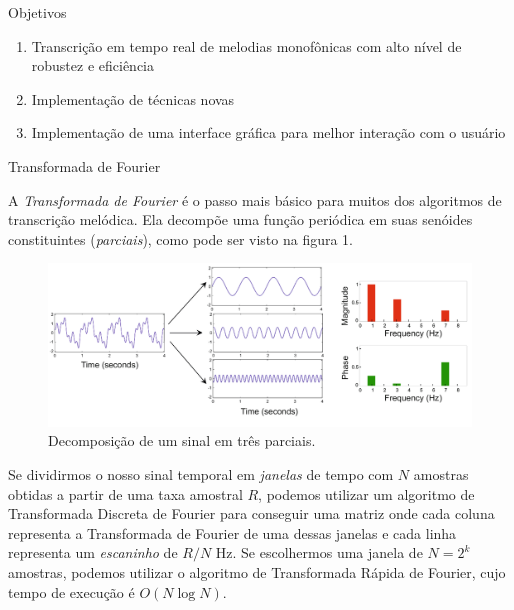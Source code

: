 \documentclass[final,hyperref={pdfpagelabels=false}]{beamer}
\begin{document}
\begin{frame}[t]
\begin{columns}[t]
\begin{column}{.465\textwidth}

\begin{block}{Objetivos}

\begin{enumerate}
\item Transcrição em tempo real de melodias monofônicas com alto nível de robustez e eficiência
\item Implementação de técnicas novas
\item Implementação de uma interface gráfica para melhor interação com o usuário
\end{enumerate}

\end{block}


\begin{block}{Transformada de Fourier}

A \emph{Transformada de Fourier} é o passo mais básico para muitos dos algoritmos de transcrição melódica. Ela decompõe uma função periódica em suas senóides constituintes (\emph{parciais}), como pode ser visto na figura 1.

\begin{figure}%
\centering
\includegraphics[width=0.7\linewidth]{fourier3}
\caption{Decomposição de um sinal em três parciais.}
\end{figure}

Se dividirmos o nosso sinal temporal em \emph{janelas} de tempo com $N$ amostras obtidas a partir de uma taxa amostral $R$, podemos utilizar um algoritmo de Transformada Discreta de Fourier para conseguir uma matriz onde cada coluna representa a Transformada de Fourier de uma dessas janelas e cada linha representa um \emph{escaninho} de $R/N$ Hz. Se escolhermos uma janela de $N=2^k$ amostras, podemos utilizar o algoritmo de Transformada Rápida de Fourier, cujo tempo de execução é $O(N\log{}N)$.


\end{block}
\end{column}
\end{columns}
\end{frame}
\end{document}
